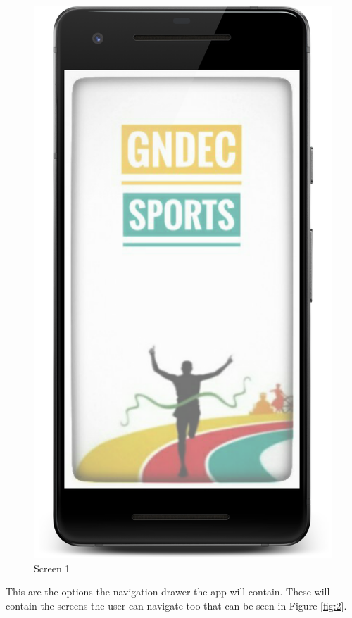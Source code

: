 \begin{figure}[ht]
\centering
\includegraphics[scale=0.5]{images/s1.png}
\caption{Screen 1}
\label{fig:1}
\end{figure}

\noindent This are the options the navigation drawer the app will contain. These will contain the screens the user can navigate too that can be seen in Figure \ref{fig:2}. \\

